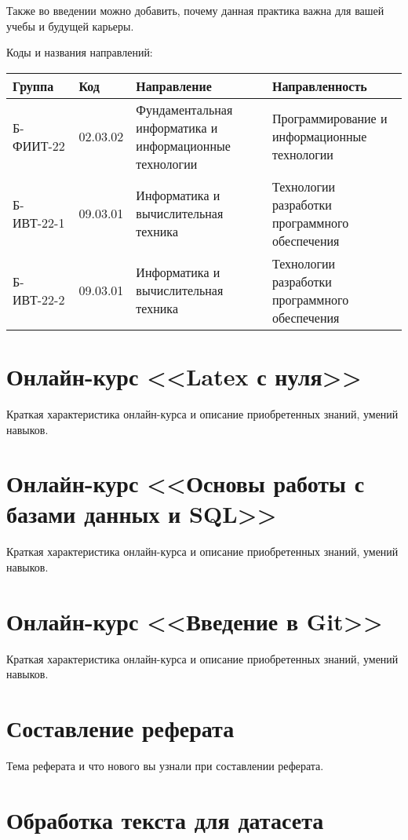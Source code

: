 \documentclass[12pt]{article}
\begin{document}
Также во введении можно добавить, почему данная практика важна для вашей учебы и будущей карьеры.

Коды и названия направлений:

\noindent
\begin{tabularx}{\textwidth}{ | p{2.3cm} | p{1.5cm} | X | X | } \hline
Группа & Код & Направление & Направленность \\ \hline
Б-ФИИТ-22 & 02.03.02 & Фундаментальная информатика и информационные технологии & Программирование и информационные технологии \\ \hline
Б-ИВТ-22-1 & 09.03.01 & Информатика и вычислительная техника & Технологии разработки программного обеспечения \\ \hline
Б-ИВТ-22-2 & 09.03.01 & Информатика и вычислительная техника & Технологии разработки программного обеспечения \\ \hline
\end{tabularx}

\section{Онлайн-курс <<Latex с нуля>>}

Краткая характеристика онлайн-курса и описание приобретенных знаний, умений навыков.

\section{Онлайн-курс <<Основы работы с базами данных и SQL>>}

Краткая характеристика онлайн-курса и описание приобретенных знаний, умений навыков.

\section{Онлайн-курс <<Введение в Git>>}

Краткая характеристика онлайн-курса и описание приобретенных знаний, умений навыков.
	
\section{Составление реферата}

Тема реферата и что нового вы узнали при составлении реферата.

\section{Обработка текста для датасета}
\end{document}
